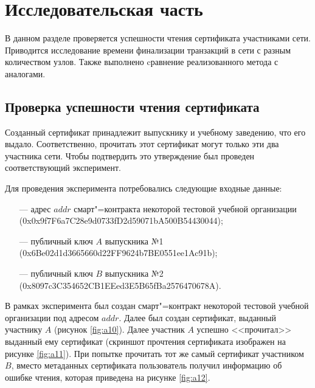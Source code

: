 \section{Исследовательская часть}

В данном разделе проверяется успешности чтения сертификата участниками сети. Приводится исследование времени финализации транзакций в сети с разным количеством узлов. Также выполнено cравнение реализованного метода с аналогами.


\subsection{Проверка успешности чтения сертификата}

Созданный сертификат принадлежит выпускнику и учебному заведению, что его выдало. Соответственно, прочитать этот сертификат могут только эти два участника сети. Чтобы подтвердить это утверждение был проведен соответствующий эксперимент.

Для проведения эксперимента потребовались следующие входные данные:
\begin{itemize}[leftmargin=1.6\parindent]
	\item[---] адрес $addr$ смарт"=контракта некоторой тестовой учебной организации (0x0x9f7F6a7C28e9d0733fD2d59071bA500B54430044);
	\item[---] публичный ключ $A$ выпускника №1 \\
	(0x6Be02d1d3665660d22FF9624b7BE0551ee1Ac91b);
	\item[---] публичный ключ $B$ выпускника №2 \\
	(0x8097c3C354652CB1EEed3E5B65fBa2576470678A).
\end{itemize}

В рамках эксперимента был создан смарт"=контракт некоторой тестовой учебной организации под адресом $addr$. Далее был создан сертификат, выданный участнику $A$ (рисунок \ref{fig:a10}). Далее участник $A$ успешно <<прочитал>> выданный ему сертификат (скриншот прочтения сертификата изображен на рисунке \ref{fig:a11}). При попытке прочитать тот же самый сертификат участником $B$, вместо метаданных сертификата пользователь получил информацию об ошибке чтения, которая приведена на рисунке \ref{fig:a12}.

